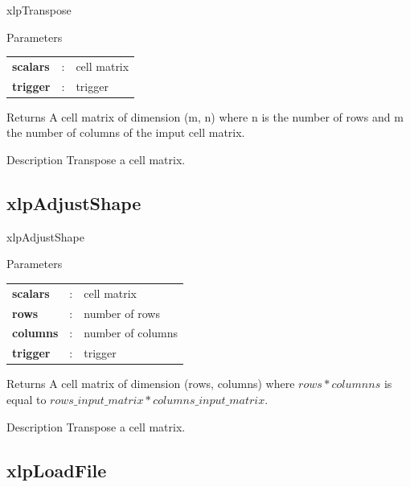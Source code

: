 \begin{xlpfunctitle}{xlpTranspose}

\begin{xlpfunc}{Parameters}
\begin{tabular}{p{3.5cm}cl}
\textbf{scalars}& : & cell matrix \\
\textbf{trigger}& : & trigger 
\end{tabular}
\end{xlpfunc}


\begin{xlpfunc}{Returns}
A cell matrix of dimension (m, n) where n is the number of rows and m the number of columns of the imput cell matrix.
\end{xlpfunc}

\begin{xlpfunc}{Description}
Transpose a cell matrix.
\end{xlpfunc}
\end{xlpfunctitle}




\subsection{xlpAdjustShape}

\begin{xlpfunctitle}{xlpAdjustShape}

\begin{xlpfunc}{Parameters}
\begin{tabular}{p{3.5cm}cl}
\textbf{scalars}& : & cell matrix \\
\textbf{rows}& : & number of rows \\
\textbf{columns}& : & number of columns \\
\textbf{trigger}& : & trigger 
\end{tabular}
\end{xlpfunc}


\begin{xlpfunc}{Returns}
A cell matrix of dimension (rows, columns) where $rows * columnns$ is  equal to $rows\_input\_matrix * columns\_input\_matrix$.  
\end{xlpfunc}

\begin{xlpfunc}{Description}
Transpose a cell matrix.
\end{xlpfunc}
\end{xlpfunctitle}


\subsection{xlpLoadFile}

